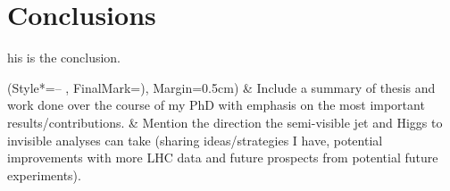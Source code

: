 \let\textcircled=\pgftextcircled
\chapter{Conclusions}
\label{chap:conclusions}

his is the conclusion.

\begin{easylist}[itemize]
\ListProperties(Style*=-- , FinalMark={)}, Margin=0.5cm)
& Include a summary of thesis and work done over the course of my PhD with emphasis on the most important results/contributions.
& Mention the direction the semi-visible jet and Higgs to invisible analyses can take (sharing ideas/strategies I have, potential improvements with more LHC data and future prospects from potential future experiments).
\end{easylist}
